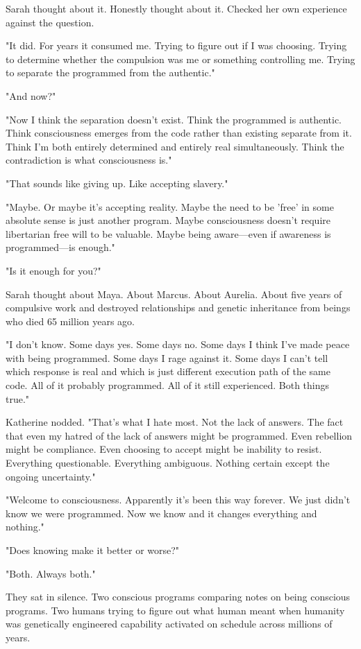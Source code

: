 Sarah thought about it. Honestly thought about it. Checked her own experience against the question.

"It did. For years it consumed me. Trying to figure out if I was choosing. Trying to determine whether the compulsion was me or something controlling me. Trying to separate the programmed from the authentic."

"And now?"

"Now I think the separation doesn't exist. Think the programmed is authentic. Think consciousness emerges from the code rather than existing separate from it. Think I'm both entirely determined and entirely real simultaneously. Think the contradiction is what consciousness is."

"That sounds like giving up. Like accepting slavery."

"Maybe. Or maybe it's accepting reality. Maybe the need to be 'free' in some absolute sense is just another program. Maybe consciousness doesn't require libertarian free will to be valuable. Maybe being aware—even if awareness is programmed—is enough."

"Is it enough for you?"

Sarah thought about Maya. About Marcus. About Aurelia. About five years of compulsive work and destroyed relationships and genetic inheritance from beings who died 65 million years ago.

"I don't know. Some days yes. Some days no. Some days I think I've made peace with being programmed. Some days I rage against it. Some days I can't tell which response is real and which is just different execution path of the same code. All of it probably programmed. All of it still experienced. Both things true."

Katherine nodded. "That's what I hate most. Not the lack of answers. The fact that even my hatred of the lack of answers might be programmed. Even rebellion might be compliance. Even choosing to accept might be inability to resist. Everything questionable. Everything ambiguous. Nothing certain except the ongoing uncertainty."

"Welcome to consciousness. Apparently it's been this way forever. We just didn't know we were programmed. Now we know and it changes everything and nothing."

"Does knowing make it better or worse?"

"Both. Always both."

They sat in silence. Two conscious programs comparing notes on being conscious programs. Two humans trying to figure out what human meant when humanity was genetically engineered capability activated on schedule across millions of years.

